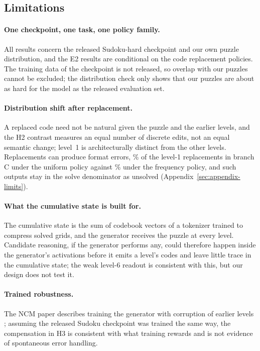 \subsection{Limitations}
\label{sec:discussion-limitations}

\paragraph{One checkpoint, one task, one policy family.} All results concern the released Sudoku-hard checkpoint and our own puzzle distribution, and the E2 results are conditional on the code replacement policies. The training data of the checkpoint is not released, so overlap with our puzzles cannot be excluded; the distribution check only shows that our puzzles are about as hard for the model as the released evaluation set.

\paragraph{Distribution shift after replacement.} A replaced code need not be natural given the puzzle and the earlier levels, and the H2 contrast measures an equal number of discrete edits, not an equal semantic change; level~1 is architecturally distinct from the other levels. Replacements can produce format errors, \% of the level-1 replacements in branch C under the uniform policy against \% under the frequency policy, and such outputs stay in the solve denominator as unsolved (Appendix~\ref{sec:appendix-limits}).

\paragraph{What the cumulative state is built for.} The cumulative state is the sum of codebook vectors of a tokenizer trained to compress solved grids, and the generator receives the puzzle at every level. Candidate reasoning, if the generator performs any, could therefore happen inside the generator's activations before it emits a level's codes and leave little trace in the cumulative state; the weak level-6 readout is consistent with this, but our design does not test it.

\paragraph{Trained robustness.} The NCM paper describes training the generator with corruption of earlier levels \citep{kumbong2026ncm}; assuming the released Sudoku checkpoint was trained the same way, the compensation in H3 is consistent with what training rewards and is not evidence of spontaneous error handling.

